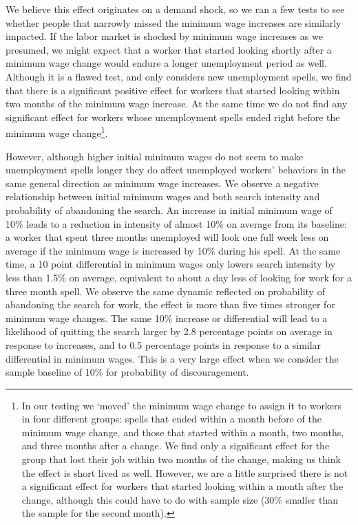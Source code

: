 \documentclass{article}
\begin{document}
We believe this effect originates on a demand shock, so we ran a few tests to see whether people that narrowly missed the minimum wage increases are similarly impacted. If the labor market is shocked by minimum wage increases as we presumed, we might expect that a worker that started looking shortly after a minimum wage change would endure a longer unemployment period as well. Although it is a flawed test, and only considers new unemployment spells, we find that there is a significant positive effect for workers that started looking within two months of the minimum wage increase. At the same time we do not find any significant effect for workers whose unemployment spells ended right before the minimum wage change\footnote{In our testing we `moved' the minimum wage change to assign it to workers in four different groups: spells that ended within a month before of the minimum wage change, and those that started within a month, two months, and three months after a change. We find only a significant effect for the group that lost their job within two months of the change, making us think the effect is short lived as well. However, we are a little surprised there is not a significant effect for workers that started looking within a month after the change, although this could have to do with sample size (30\% smaller than the sample for the second month).}.

However, although higher initial minimum wages do not seem to make unemployment spells longer they do affect unemployed workers' behaviors in the same general direction as minimum wage increases. We observe a negative relationship between initial minimum wages and both search intensity and probability of abandoning the search. An increase in initial minimum wage of 10\% leads to a reduction in intensity of almost 10\% on average from its baseline: a worker that spent three months unemployed will look one full week less on average if the minimum wage is increased by 10\% during his spell. At the same time, a 10 point differential in minimum wages only lowers search intensity by less than 1.5\% on average, equivalent to about a day less of looking for work for a three month spell. We observe the same dynamic reflected on probability of abandoning the search for work, the effect is more than five times stronger for minimum wage changes. The same 10\% increase or differential will lead to a likelihood of quitting the search larger by 2.8 percentage points on average in response to increases, and to 0.5 percentage points in response to a similar differential in minimum wages. This is a very large effect when we consider the sample baseline of 10\% for probability of discouragement.
\end{document}

